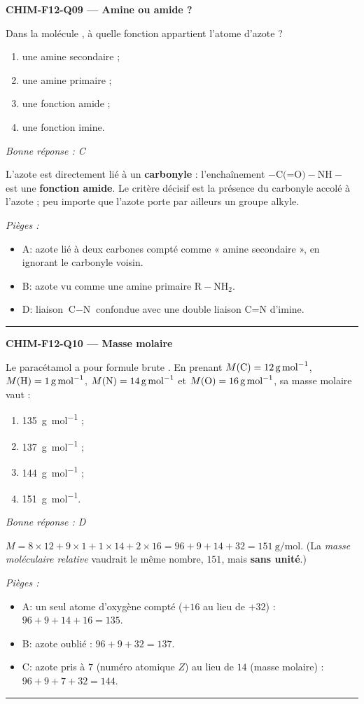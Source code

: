 \documentclass[11pt,a4paper]{article}
\begin{document}
\noindent\textbf{CHIM-F12-Q09 --- Amine ou amide ?}\par
Dans la molécule , à quelle fonction appartient l'atome d'azote ?
\begin{enumerate}[label=\Alph*)]
\item une amine secondaire ;
\item une amine primaire ;
\item une fonction amide ;
\item une fonction imine.
\end{enumerate}
\textit{Bonne réponse : C}\par
L'azote est directement lié à un \textbf{carbonyle}  : l'enchaînement $-\text{C(=O)}-\text{NH}-$ est une \textbf{fonction amide}. Le critère décisif est la présence du carbonyle accolé à l'azote ; peu importe que l'azote porte par ailleurs un groupe alkyle.\par
\textit{Pièges :}
\begin{itemize}
\item A: azote lié à deux carbones compté comme « amine secondaire », en ignorant le carbonyle voisin.
\item B: azote vu comme une amine primaire $\text{R}-\text{NH}_2$.
\item D: liaison $\text{C}-\text{N}$ confondue avec une double liaison $\text{C=N}$ d'imine.
\end{itemize}
\vspace{8pt}\hrule\vspace{8pt}

\noindent\textbf{CHIM-F12-Q10 --- Masse molaire}\par
Le paracétamol a pour formule brute . En prenant $M(\ce{C})=\qty{12}{\g\per\mole}$, $M(\ce{H})=\qty{1}{\g\per\mole}$, $M(\ce{N})=\qty{14}{\g\per\mole}$ et $M(\ce{O})=\qty{16}{\g\per\mole}$, sa masse molaire vaut :
\begin{enumerate}[label=\Alph*)]
\item \qty{135}{\g\per\mole} ;
\item \qty{137}{\g\per\mole} ;
\item \qty{144}{\g\per\mole} ;
\item \qty{151}{\g\per\mole}.
\end{enumerate}
\textit{Bonne réponse : D}\par
$M=8\times12+9\times1+1\times14+2\times16=96+9+14+32=\qty{151}{\g\per\mole}$. (La \emph{masse moléculaire relative} vaudrait le même nombre, $151$, mais \textbf{sans unité}.)\par
\textit{Pièges :}
\begin{itemize}
\item A: un seul atome d'oxygène compté ($+16$ au lieu de $+32$) : $96+9+14+16=135$.
\item B: azote oublié : $96+9+32=137$.
\item C: azote pris à $7$ (numéro atomique $Z$) au lieu de $14$ (masse molaire) : $96+9+7+32=144$.
\end{itemize}
\vspace{8pt}\hrule\vspace{8pt}
\end{document}
